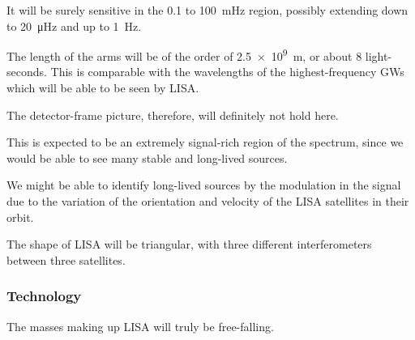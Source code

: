 \documentclass[main.tex]{subfiles}
\begin{document}
It will be surely sensitive in the \num{.1} to \SI{100}{mHz} region, possibly extending down to \SI{20}{\micro Hz} and up to \SI{1}{Hz}. 

The length of the arms will be of the order of \SI{2.5e9}{m}, or about 8 light-seconds. This is comparable with the wavelengths of the highest-frequency GWs which will be able to be seen by LISA. 

The detector-frame picture, therefore, will definitely not hold here. 

This is expected to be an extremely signal-rich region of the spectrum, since we would be able to see many stable and long-lived sources. 

We might be able to identify long-lived sources by the modulation in the signal due to the variation of the orientation and velocity of the LISA satellites in their orbit.

The shape of LISA will be triangular, with three different interferometers between three satellites. 

\subsubsection{Technology}

The masses making up LISA will truly be free-falling. 

\end{document}
